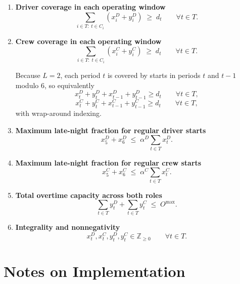 \begin{enumerate}
    \item \textbf{Driver coverage in each operating window}
    \[
    \sum_{i\in T:\; t\in C_i} \left(x_i^{D}+y_i^{D}\right) \;\ge\; d_t
    \qquad \forall t\in T.
    \]

    \item \textbf{Crew coverage in each operating window}
    \[
    \sum_{i\in T:\; t\in C_i} \left(x_i^{C}+y_i^{C}\right) \;\ge\; d_t
    \qquad \forall t\in T.
    \]

    Because $L=2$, each period $t$ is covered by starts in periods $t$ and $t-1$ modulo 6, so equivalently
    \[
    x_t^{D}+y_t^{D}+x_{t-1}^{D}+y_{t-1}^{D}\ge d_t \qquad \forall t\in T,
    \]
    \[
    x_t^{C}+y_t^{C}+x_{t-1}^{C}+y_{t-1}^{C}\ge d_t \qquad \forall t\in T,
    \]
    with wrap-around indexing.

    \item \textbf{Maximum late-night fraction for regular driver starts}
    \[
    x_5^{D}+x_6^{D} \;\le\; \alpha^{D}\sum_{t\in T} x_t^{D}.
    \]

    \item \textbf{Maximum late-night fraction for regular crew starts}
    \[
    x_5^{C}+x_6^{C} \;\le\; \alpha^{C}\sum_{t\in T} x_t^{C}.
    \]

    \item \textbf{Total overtime capacity across both roles}
    \[
    \sum_{t\in T} y_t^{D}+\sum_{t\in T} y_t^{C} \;\le\; O^{\max}.
    \]

    \item \textbf{Integrality and nonnegativity}
    \[
    x_t^{D},x_t^{C},y_t^{D},y_t^{C}\in \mathbb{Z}_{\ge 0}
    \qquad \forall t\in T.
    \]
\end{enumerate}

\section*{Notes on Implementation}

